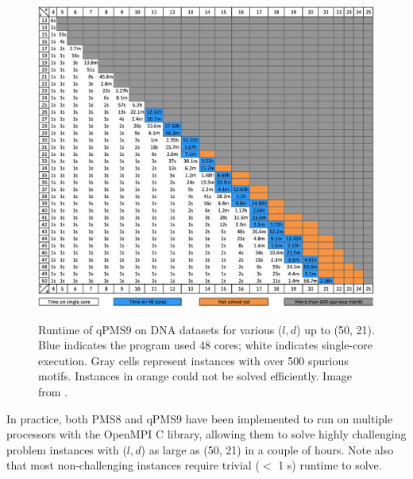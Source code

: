 \documentclass[oneside,12pt]{DISCSthesis}
\begin{document}
		\begin{figure}[ht] \label{fig:qpms9}
			{\centering \includegraphics[width=5.3in]{img/qpms9}\\}
			\caption[Runtime of qPMS9 for various ($l,d$)]{Runtime of qPMS9 on DNA datasets for various ($l,d$) up to (50, 21). Blue indicates the program used 48 cores; white indicates single-core execution. Gray cells represent instances with over 500 spurious motifs. Instances in orange could not be solved efficiently. Image from \cite{pms2015}.}
			\end{figure}\vspace*{3mm}

		\noindent In practice, both PMS8 and qPMS9 have been implemented to run on multiple processors with the OpenMPI C library, allowing them to solve highly challenging problem instances with ($l, d$) as large as (50, 21) in a couple of hours. Note also that most non-challenging instances require trivial ($<$ 1 s) runtime to solve.
		\newpage
\end{document}
